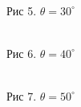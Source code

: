 \documentclass[12pt]{article}
\begin{document}
  \begin{figure}[h!]
    \begin{minipage}[h]{0.32\linewidth}
      \\
      Рис 5. $\theta = 30^{\circ}$
    \end{minipage}
    \begin{minipage}[h]{0.32\linewidth}
      \\
      Рис 6. $\theta = 40^{\circ}$
    \end{minipage}
    \begin{minipage}[h]{0.32\linewidth}
      \\
      Рис 7. $\theta = 50^{\circ}$
    \end{minipage}
  \end{figure}
\end{document}
